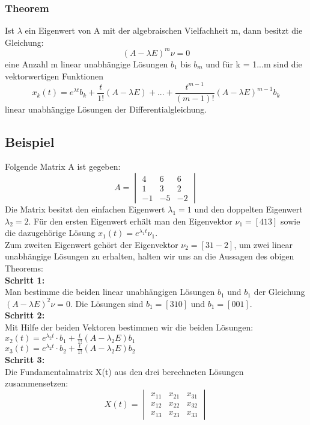 \subsubsection{Theorem}
Ist $\lambda$ ein Eigenwert von A mit der algebraischen Vielfachheit m, dann besitzt die Gleichung: 
\begin{equation*}
(A-\lambda E)^m\nu = 0
\end{equation*}
eine Anzahl m linear unabhängige Lösungen $b_1$ bis $b_m$ und für k = 1...m sind die vektorwertigen Funktionen
\begin{equation*}
x_k(t) = e^{\lambda t}{b_k + \frac{t}{1!}(A-\lambda E) + ... + \frac{t^{m-1}}{(m-1)!}(A-\lambda E)^{m-1}b_k}
\end{equation*}
linear unabhängige Lösungen der Differentialgleichung. 
\subsection{Beispiel}
Folgende Matrix A ist gegeben: 
\begin{equation*}
	A =     
	\begin{vmatrix} 
	        4 & 6 & 6 \\ 
	        1 & 3 & 2 \\
	        -1 & -5 & -2    
	\end{vmatrix}
\end{equation*}
Die Matrix besitzt den einfachen Eigenwert $\lambda_1 = 1$ und den doppelten Eigenwert $\lambda_2=2$. Für den ersten Eigenwert erhält man den Eigenvektor $\nu_1 = [4 1 3]$ sowie die dazugehörige Lösung $x_1(t) = e^{\lambda_1 t}\nu_1$.\\
Zum zweiten Eigenwert gehört der Eigenvektor $\nu_2 = [3 1 -2]$, um zwei linear unabhängige Lösungen zu erhalten, halten wir uns an die Aussagen des obigen Theorems:\\ 
\textbf{Schritt 1:} \\
Man bestimme die beiden linear unabhängigen Lösungen $b_1$ und $b_1$ der Gleichung $(A-\lambda E)^2 \nu =0$.
Die Lösungen sind $b_1 =  [3 1 0]$ und $b_1 =  [0 0 1]$. \\
\textbf{Schritt 2:} \\
Mit Hilfe der beiden Vektoren bestimmen wir die beiden Lösungen: \\
$x_2(t) = e^{\lambda_2 t} \cdot {b_1 + \frac{t}{1!}(A-\lambda_2 E)b_1}$\\
$x_3(t) = e^{\lambda_2 t} \cdot {b_2 + \frac{t}{1!}(A-\lambda_2 E)b_2}$\\
\textbf{Schritt 3:} \\
Die Fundamentalmatrix X(t) aus den drei berechneten Lösungen zusammensetzen:\\
\begin{equation*}
	X(t) =     
	\begin{vmatrix} 
	        x_{11} & x_{21} & x_{31}\\ 
	        x_{12} & x_{22} & x_{32}\\
	        x_{13} & x_{23} & x_{33}    
	\end{vmatrix}
\end{equation*}
